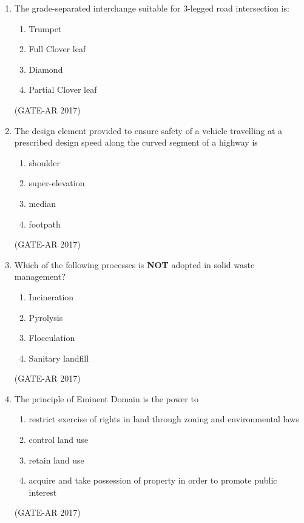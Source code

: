 \documentclass[a4paper,10pt]{article}
\begin{document}
\begin{enumerate}
    \item The grade-separated interchange suitable for 3-legged road intersection is: 
    \begin{multicols}{4}
	\begin{enumerate}
        \item Trumpet
        \item Full Clover leaf
        \item Diamond
        \item Partial Clover leaf
    \end{enumerate}
	\end{multicols}
    \hfill (GATE-AR 2017)
    
    \item The design element provided to ensure safety of a vehicle travelling at a prescribed design speed along the curved segment of a highway is 
    \begin{multicols}{4}
	\begin{enumerate}
        \item shoulder
        \item super-elevation
        \item median
        \item footpath
    \end{enumerate}
	\end{multicols}
    \hfill (GATE-AR 2017)
    
    \item Which of the following processes is \textbf{NOT} adopted in solid waste management? 
    \begin{multicols}{4}
	\begin{enumerate}
        \item Incineration
        \item Pyrolysis
        \item Flocculation
        \item Sanitary landfill
    \end{enumerate}
	\end{multicols}
    \hfill (GATE-AR 2017)
    
    \item The principle of Eminent Domain is the power to 
    \begin{enumerate}
        \item restrict exercise of rights in land through zoning and environmental laws
        \item control land use
        \item retain land use
        \item acquire and take possession of property in order to promote public interest
    \end{enumerate}
    \hfill (GATE-AR 2017)
    

\end{enumerate}
\end{document}

